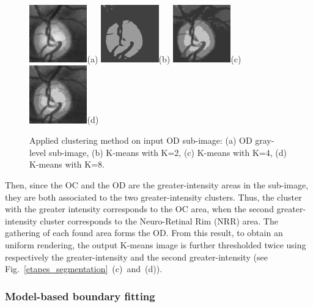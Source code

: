 \begin{figure}[t]
 \centering
 \includegraphics[width=2.5cm]{Images/Methode/Segmentation/0_crop.png}{(a)}
 \includegraphics[width=2.5cm]{Images/Methode/Segmentation/Kmeans/clustering2.png}{(b)}
 \includegraphics[width=2.5cm]{Images/Methode/Segmentation/1_kmeans.png}{(c)}
 \includegraphics[width=2.5cm]{Images/Methode/Segmentation/Kmeans/clustering8.png}{(d)}
 \caption{\label{kmeans} Applied clustering method on input OD sub-image: (a) OD gray-level sub-image, (b) K-means with K=2, (c) K-means with K=4, (d) K-means with K=8.}
 
\end{figure}

Then, since the OC and the OD are the greater-intensity areas in the sub-image, they are both associated to the two greater-intensity clusters. Thus, the cluster with the greater intensity corresponds to the OC area, when the second greater-intensity cluster corresponds to the Neuro-Retinal Rim (NRR) area. The gathering of each found area forms the OD.
From this result, to obtain an uniform rendering, the output K-means image is further thresholded twice using respectively the greater-intensity and the second greater-intensity (see \mbox{Fig. \ref{etapes_segmentation} (c) and (d)}).

\subsubsection{\label{boundaries_detection}Model-based boundary fitting}

